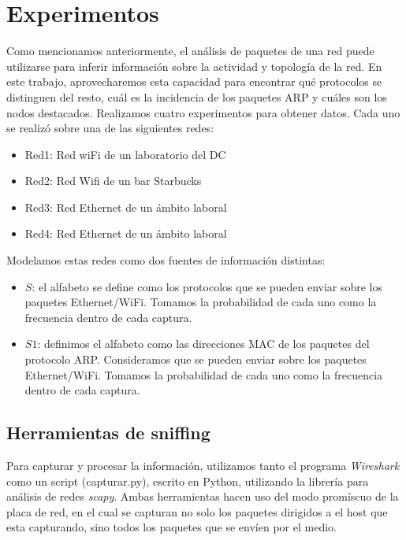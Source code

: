 \section{Experimentos}

Como mencionamos anteriormente, el análisis de paquetes de una red puede utilizarse para inferir información sobre la actividad y topología de la red. En este trabajo, aprovecharemos esta capacidad para encontrar qué protocolos se distinguen del resto, cuál es la incidencia de los paquetes ARP y cuáles son los nodos destacados.
Realizamos cuatro experimentos para obtener datos. Cada uno se realizó sobre una de las siguientes redes:
\begin{itemize}
	\item Red1: Red wiFi de un laboratorio del DC
	\item Red2: Red Wifi de un bar Starbucks
	\item Red3: Red Ethernet de un ámbito laboral
	\item Red4: Red Ethernet de un ámbito laboral
\end{itemize}

Modelamos estas redes como dos fuentes de información distintas:

\begin{itemize}
	\item $S$: el alfabeto se define como los protocolos que se pueden enviar sobre los paquetes Ethernet/WiFi. Tomamos la probabilidad de cada uno como la frecuencia dentro de cada captura.
	\item $S1$: definimos el alfabeto como las direcciones MAC de los paquetes del protocolo ARP. Consideramos  que se pueden enviar sobre los paquetes Ethernet/WiFi. Tomamos la probabilidad de cada uno como la frecuencia dentro de cada captura.

\end{itemize}


\subsection{Herramientas de sniffing}

Para capturar y procesar la información, utilizamos tanto el programa \textit{Wireshark} como un script (capturar.py), escrito en Python, utilizando la librería para análisis de redes \textit{scapy}. Ambas herramientas hacen uso del modo promíscuo de la placa de red, en el cual se capturan no solo los paquetes dirigidos a el host que esta capturando, sino todos los paquetes que se envíen por el medio.

